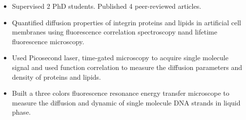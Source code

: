 \documentclass[10pt,a4paper,ragged2e,withhyper]{altacv}
\begin{document}
\begin{paracol}{2}
\begin{itemize}
	   		        \item Supervised 2 PhD students. Published 4 peer-reviewed articles.
                
            \end{itemize}
            \divider
            
            \begin{itemize}
                \item Quantified diffusion properties of integrin proteins and lipids in artificial cell membranes using fluorescence correlation spectroscopy nand lifetime fluorescence microscopy.
                \item Used Picosecond laser, time-gated microscopy to acquire single molecule signal and used function correlation to measure the diffusion parameters and density of proteins and lipids. 
            \end{itemize}            
             \divider           
            \begin{itemize}
                \item Built a three colors fluorescence resonance energy transfer microscope to measure the diffusion and dynamic of single molecule DNA strands in liquid phase.     
            \end{itemize}
        

        
            
            \begin{itemize}
            \end{itemize}
            \medskip
            

\end{paracol}
\end{document}
